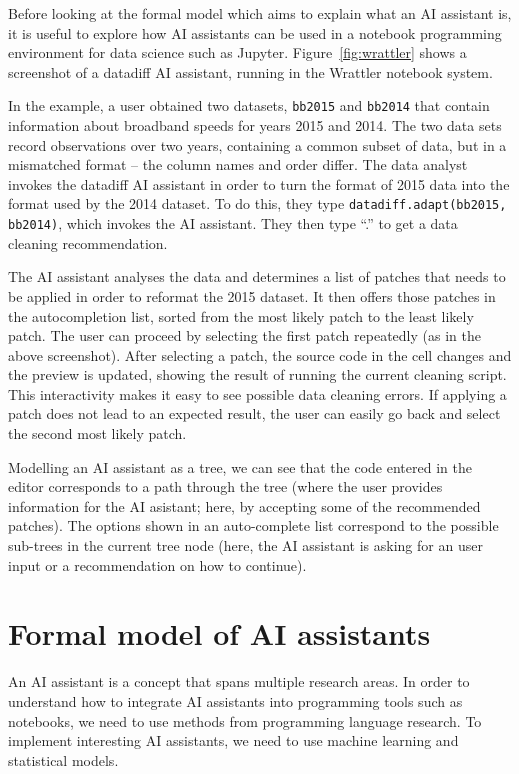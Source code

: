 \documentclass{article}
\begin{document}
Before looking at the formal model which aims to explain what an AI assistant is, it is useful 
to explore how AI assistants can be used in a notebook programming environment for data science 
such as Jupyter. Figure~\ref{fig:wrattler} shows a screenshot of a datadiff AI assistant, running
in the Wrattler notebook system.

In the example, a user obtained two datasets, \texttt{bb2015} and \texttt{bb2014} that contain 
information about broadband speeds for years 2015 and 2014. The two data sets record observations
over two years, containing a common subset of data, but in a mismatched format -- the column names
and order differ. The data analyst invokes the datadiff AI 
assistant in order to turn the format of 2015 data into the format used by the 2014 dataset.
To do this, they type \texttt{datadiff.adapt(bb2015, bb2014)}, which invokes the AI assistant.
They then type ``.'' to get a data cleaning recommendation.

The AI assistant analyses the data and determines a list of patches that needs to be applied in
order to reformat the 2015 dataset. It then offers those patches in the autocompletion list, 
sorted from the most likely patch to the least likely patch. The user can proceed by selecting 
the first patch repeatedly (as in the above screenshot). After selecting a patch, the source code
in the cell changes and the preview is updated, showing the result of running the current cleaning
script. This interactivity makes it easy to see possible data cleaning errors. If applying a patch
does not lead to an expected result, the user can easily go back and select the second most likely
patch.

Modelling an AI assistant as a tree, we can see that the code entered in the editor corresponds to
a path through the tree (where the user provides information for the AI asistant; here, by 
accepting some of the recommended patches). The options shown in an auto-complete list correspond 
to the possible sub-trees in the current tree node (here, the AI assistant is asking for an user 
input or a recommendation on how to continue). 


\section{Formal model of AI assistants}
\label{sec:trees}

An AI assistant is a concept that spans multiple research areas. In order to understand how to 
integrate AI assistants into programming tools such as notebooks, we need to use methods from 
programming language research. To implement interesting AI assistants, we need to use machine 
learning and statistical models.
\end{document}

